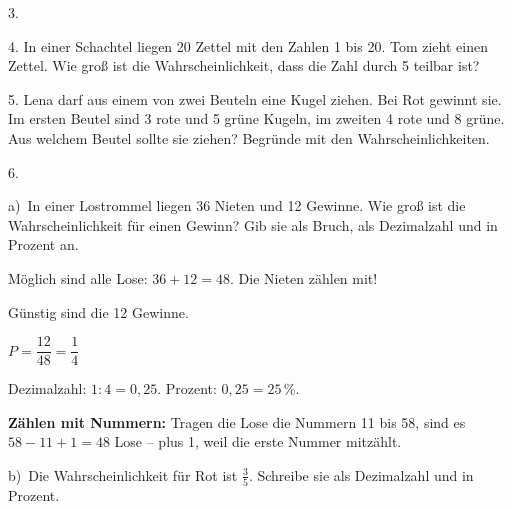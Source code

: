 \documentclass[11pt]{article}
\newcommand{\grau}[1]{{\color{mbgrau}#1}}
\begin{document}
\begin{pfaufg}{}{3.}{}
\end{pfaufg}

\begin{pfaufg}{}{4.}{}
In einer Schachtel liegen 20 Zettel mit den Zahlen 1 bis 20. Tom zieht einen Zettel. Wie groß ist die Wahrscheinlichkeit, dass die Zahl durch 5 teilbar ist?
\end{pfaufg}

\begin{pfaufg}{}{5.}{}
Lena darf aus einem von zwei Beuteln eine Kugel ziehen. Bei Rot gewinnt sie. Im ersten Beutel sind 3 rote und 5 grüne Kugeln, im zweiten 4 rote und 8 grüne. Aus welchem Beutel sollte sie ziehen? Begründe mit den Wahrscheinlichkeiten.
\end{pfaufg}

\begin{pfaufg}{}{6.}{}
\grau{a)\ In einer Lostrommel liegen 36 Nieten und 12 Gewinne. Wie groß ist die Wahrscheinlichkeit für einen Gewinn? Gib sie als Bruch, als Dezimalzahl und in Prozent an.\par\smallskip Möglich sind alle Lose: $36 + 12 = 48$. Die Nieten zählen mit!\par Günstig sind die 12 Gewinne.\par $P = \dfrac{12}{48} = \dfrac{1}{4}$\par Dezimalzahl: $1 : 4 = 0{,}25$. Prozent: $0{,}25 = 25\,\%$.\par \textbf{Zählen mit Nummern:} Tragen die Lose die Nummern 11 bis 58, sind es $58 - 11 + 1 = 48$ Lose – plus 1, weil die erste Nummer mitzählt.}
\par\medskip
b)\ Die Wahrscheinlichkeit für Rot ist $\frac{3}{5}$. Schreibe sie als Dezimalzahl und in Prozent.
\end{pfaufg}
\end{document}
